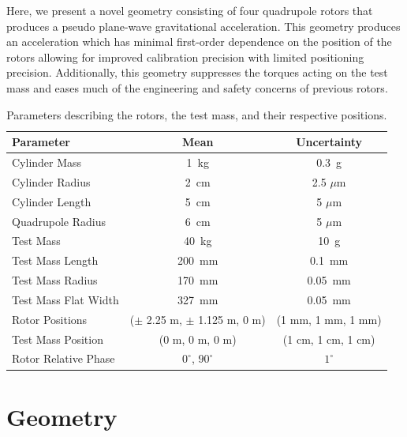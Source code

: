 \documentclass[superscriptaddress, twocolumn, prd]{revtex4-1}
\begin{document}
Here, we present a novel geometry consisting of four quadrupole rotors that produces a pseudo plane-wave gravitational acceleration. This geometry produces an acceleration which has minimal first-order dependence on the position of the rotors allowing for improved calibration precision with limited positioning precision. Additionally, this geometry suppresses the torques acting on the test mass and eases much of the engineering and safety concerns of previous rotors.

\begin{widetext}
\begingroup
\setlength{\tabcolsep}{10pt} %
\renewcommand{\arraystretch}{1.5} %

\begin{table}[h!]
\begin{center}
\begin{tabular}{ |l|c|c| }
\hline
 Parameter & Mean & Uncertainty \\
 \hline
Cylinder Mass & 1~kg & 0.3~g \\
Cylinder Radius & 2~cm & 2.5 $\mu$m \\
Cylinder Length & 5~cm & 5 $\mu$m \\
Quadrupole Radius & 6~cm & 5 $\mu$m \\
Test Mass & 40~kg & 10~g \\
Test Mass Length & 200~mm & 0.1~mm\\
Test Mass Radius & 170~mm & 0.05~mm\\
Test Mass Flat Width & 327~mm & 0.05~mm\\
Rotor Positions & ($\pm$ 2.25 m, $\pm$ 1.125 m, 0 m) & (1 mm, 1 mm, 1 mm) \\
Test Mass Position & (0 m, 0 m, 0 m) & (1 cm, 1 cm, 1 cm) \\
Rotor Relative Phase & $0^\circ$, $90^\circ$ & $1^\circ$ \\
 \hline

 \end{tabular}
 \caption{Parameters describing the rotors, the test mass, and their respective positions.}\label{param}
 \end{center}

\end{table}
\endgroup
\end{widetext}

\section{Geometry}
\end{document}
